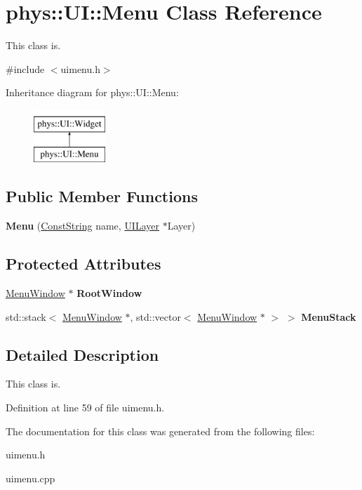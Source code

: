 \hypertarget{classphys_1_1UI_1_1Menu}{
\section{phys::UI::Menu Class Reference}
\label{d6/dd3/classphys_1_1UI_1_1Menu}
}


This class is.  




{\ttfamily \#include $<$uimenu.h$>$}

Inheritance diagram for phys::UI::Menu:\begin{figure}[H]
\begin{center}
\leavevmode
\includegraphics[height=2.000000cm]{d6/dd3/classphys_1_1UI_1_1Menu}
\end{center}
\end{figure}
\subsection*{Public Member Functions}
\begin{DoxyCompactItemize}
\item 
\hypertarget{classphys_1_1UI_1_1Menu_a695e02a0aa618d2c46408813c63b658f}{
{\bfseries Menu} (\hyperlink{namespacephys_a5ce5049f8b4bf88d6413c47b504ebb31}{ConstString} name, \hyperlink{classphys_1_1UILayer}{UILayer} $\ast$Layer)}
\label{d6/dd3/classphys_1_1UI_1_1Menu_a695e02a0aa618d2c46408813c63b658f}

\end{DoxyCompactItemize}
\subsection*{Protected Attributes}
\begin{DoxyCompactItemize}
\item 
\hypertarget{classphys_1_1UI_1_1Menu_a03f7faf891c709b0a6123d4399018f30}{
\hyperlink{classphys_1_1UI_1_1MenuWindow}{MenuWindow} $\ast$ {\bfseries RootWindow}}
\label{d6/dd3/classphys_1_1UI_1_1Menu_a03f7faf891c709b0a6123d4399018f30}

\item 
\hypertarget{classphys_1_1UI_1_1Menu_a2bbde7660e98bec8d52194ca25937bcd}{
std::stack$<$ \hyperlink{classphys_1_1UI_1_1MenuWindow}{MenuWindow} $\ast$, std::vector$<$ \hyperlink{classphys_1_1UI_1_1MenuWindow}{MenuWindow} $\ast$ $>$ $>$ {\bfseries MenuStack}}
\label{d6/dd3/classphys_1_1UI_1_1Menu_a2bbde7660e98bec8d52194ca25937bcd}

\end{DoxyCompactItemize}


\subsection{Detailed Description}
This class is. 

Definition at line 59 of file uimenu.h.



The documentation for this class was generated from the following files:\begin{DoxyCompactItemize}
\item 
uimenu.h\item 
uimenu.cpp\end{DoxyCompactItemize}
